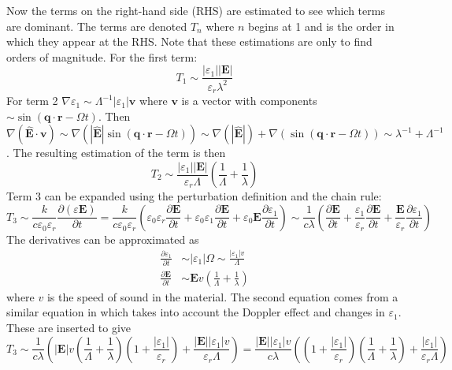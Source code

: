 \documentclass[10pt,a4paper,draft]{scrartcl}
\begin{document}
	Now the terms on the right-hand side (RHS) are estimated to see which terms are dominant. The terms are denoted $T_n$ where $n$ begins at 1 and is the order in which they appear at the RHS. Note that these estimations are only to find orders of magnitude. For the first term:
	\begin{equation*}
		T_1 \sim \frac{|\varepsilon_1| |\bm{E}|}{\varepsilon_r \lambda^2}
	\end{equation*}
	For term 2 $\nabla \varepsilon_1 \sim \Lambda^{-1} |\varepsilon_1| \bm{v}$ where $\bm{v}$ is a vector with components $\sim \sin(\bm{q} \cdot \bm{r} - \Omega t)$. Then $\nabla (\bm{\hat{E}} \cdot \bm{v}) \sim \nabla(|\bm{\hat{E}}| \sin(\bm{q} \cdot \bm{r} - \Omega t)) \sim \nabla(|\bm{\hat{E}}|) + \nabla(\sin(\bm{q} \cdot \bm{r} - \Omega t)) \sim \lambda^{-1} + \Lambda^{-1}$. The resulting estimation of the term is then
	\begin{equation*}
		T_2 \sim \frac{|\varepsilon_1| |\bm{E}|}{\varepsilon_r \Lambda} \left( \frac{1}{\Lambda} + \frac{1}{\lambda} \right)
	\end{equation*}
	Term 3 can be expanded using the perturbation definition and the chain rule:
	\begin{equation*}
		T_3 \sim \frac{k}{c\varepsilon_0\varepsilon_r} \frac{\partial (\varepsilon \bm{E})}{\partial t} = \frac{k}{c\varepsilon_0\varepsilon_r} \left( \varepsilon_0\varepsilon_r \frac{\partial \bm{E}}{\partial t} + \varepsilon_0\varepsilon_1 \frac{\partial \bm{E}}{\partial t} + \varepsilon_0\bm{E} \frac{\partial \varepsilon_1}{\partial t}\right)
		\sim \frac{1}{c\lambda} \left( \frac{\partial \bm{E}}{\partial t} + \frac{\varepsilon_1}{\varepsilon_r} \frac{\partial \bm{E}}{\partial t} + \frac{\bm{E}}{\varepsilon_r} \frac{\partial \varepsilon_1}{\partial t} \right)
	\end{equation*}
	The derivatives can be approximated as
	\begin{align*}
		\frac{\partial \varepsilon_1}{\partial t} &\sim |\varepsilon_1|\Omega \sim \frac{|\varepsilon_1| v}{\Lambda} \\
		\frac{\partial \bm{E}}{\partial t} &\sim \bm{E} v \left( \frac{1}{\Lambda} + \frac{1}{\lambda} \right)
	\end{align*}
	where $v$ is the speed of sound in the material. The second equation comes from a similar equation in \cite{Tatarskii1971} which takes into account the Doppler effect and changes in $\varepsilon_1$. These are inserted to give
	\begin{equation*}
		T_3 \sim \frac{1}{c\lambda} \left( |\bm{E}| v \left( \frac{1}{\Lambda} + \frac{1}{\lambda} \right) \left( 1 + \frac{|\varepsilon_1|}{\varepsilon_r} \right) + \frac{|\bm{E}| |\varepsilon_1| v}{\varepsilon_r \Lambda} \right) =
		\frac{|\bm{E}| |\varepsilon_1| v}{c\lambda} \left( \left( 1 + \frac{|\varepsilon_1|}{\varepsilon_r} \right) \left( \frac{1}{\Lambda} + \frac{1}{\lambda} \right) + \frac{|\varepsilon_1|}{\varepsilon_r \Lambda} \right)
	\end{equation*}
\end{document}
